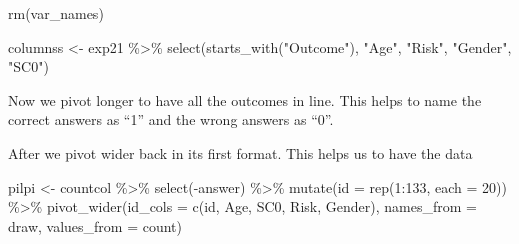 \documentclass[
]{article}
\newenvironment{Shaded}{\begin{snugshade}}{\end{snugshade}}
\newcommand{\AttributeTok}[1]{\textcolor[rgb]{0.77,0.63,0.00}{#1}}
\newcommand{\DecValTok}[1]{\textcolor[rgb]{0.00,0.00,0.81}{#1}}
\newcommand{\FunctionTok}[1]{\textcolor[rgb]{0.00,0.00,0.00}{#1}}
\newcommand{\NormalTok}[1]{#1}
\newcommand{\OtherTok}[1]{\textcolor[rgb]{0.56,0.35,0.01}{#1}}
\newcommand{\SpecialCharTok}[1]{\textcolor[rgb]{0.00,0.00,0.00}{#1}}
\newcommand{\StringTok}[1]{\textcolor[rgb]{0.31,0.60,0.02}{#1}}
\begin{document}
\begin{enumerate}
\begin{Shaded}
\begin{Highlighting}[]
\FunctionTok{rm}\NormalTok{(var\_names) }

\NormalTok{columnss }\OtherTok{\textless{}{-}}\NormalTok{ exp21 }\SpecialCharTok{\%\textgreater{}\%} 
  \FunctionTok{select}\NormalTok{(}\FunctionTok{starts\_with}\NormalTok{(}\StringTok{"Outcome"}\NormalTok{), }\StringTok{"Age"}\NormalTok{, }\StringTok{"Risk"}\NormalTok{, }\StringTok{"Gender"}\NormalTok{, }\StringTok{"SC0"}\NormalTok{) }
\end{Highlighting}
\end{Shaded}

  Now we pivot longer to have all the outcomes in line. This helps to
  name the correct answers as ``1'' and the wrong answers as ``0''.

\begin{Shaded}
\end{Shaded}

  After we pivot wider back in its first format. This helps us to have
  the data

\begin{Shaded}
\begin{Highlighting}[]
\NormalTok{pilpi }\OtherTok{\textless{}{-}}\NormalTok{ countcol }\SpecialCharTok{\%\textgreater{}\%} \FunctionTok{select}\NormalTok{(}\SpecialCharTok{{-}}\NormalTok{answer) }\SpecialCharTok{\%\textgreater{}\%} \FunctionTok{mutate}\NormalTok{(}\AttributeTok{id =} \FunctionTok{rep}\NormalTok{(}\DecValTok{1}\SpecialCharTok{:}\DecValTok{133}\NormalTok{, }\AttributeTok{each =} \DecValTok{20}\NormalTok{)) }\SpecialCharTok{\%\textgreater{}\%}  \FunctionTok{pivot\_wider}\NormalTok{(}\AttributeTok{id\_cols =} \FunctionTok{c}\NormalTok{(id, Age, SC0, Risk, Gender), }\AttributeTok{names\_from =}\NormalTok{ draw, }\AttributeTok{values\_from =}\NormalTok{ count)}
\end{Highlighting}
\end{Shaded}


\end{enumerate}
\end{document}

